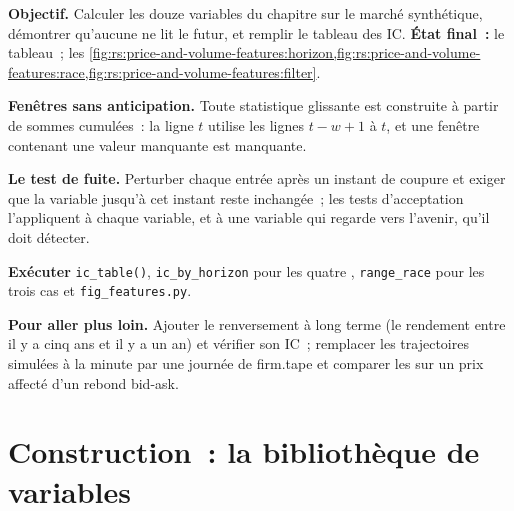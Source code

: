 \begin{tutorial}
\textbf{Objectif.} Calculer les douze variables du chapitre sur le marché synthétique, démontrer qu'aucune ne lit le futur, et remplir le tableau des IC.
\textbf{État final~:} le tableau~; les \cref{fig:rs:price-and-volume-features:horizon,fig:rs:price-and-volume-features:race,fig:rs:price-and-volume-features:filter}.
\begin{tutsteps}
\item \textbf{Fenêtres sans anticipation.} Toute statistique glissante est construite à partir de sommes cumulées~: la ligne $t$ utilise les lignes $t - w + 1$ à $t$,
et une fenêtre contenant une valeur manquante est manquante.
\label{lst:rs:price-and-volume-features:rolling}
\item \textbf{Le test de fuite.} Perturber chaque entrée après un instant de coupure et exiger que la variable jusqu'à cet instant reste inchangée~; les
tests d'acceptation l'appliquent à chaque variable, et à une variable qui regarde vers l'avenir, qu'il doit détecter.
\label{lst:rs:price-and-volume-features:leak}
\item \textbf{Exécuter} \texttt{ic\_table()}, \texttt{ic\_by\_horizon} pour les quatre , \texttt{range\_race} pour les trois cas
et \texttt{fig\_features.py}.
\end{tutsteps}
\textbf{Pour aller plus loin.} Ajouter le renversement à long terme (le rendement entre il y a cinq ans et il y a un an) et vérifier son IC~; remplacer les trajectoires
simulées à la minute par une journée de firm.tape et comparer les  sur un prix affecté d'un rebond bid-ask.
\end{tutorial}

\section{Construction~: la bibliothèque de variables}\label{bld:rs:price-and-volume-features:features}

